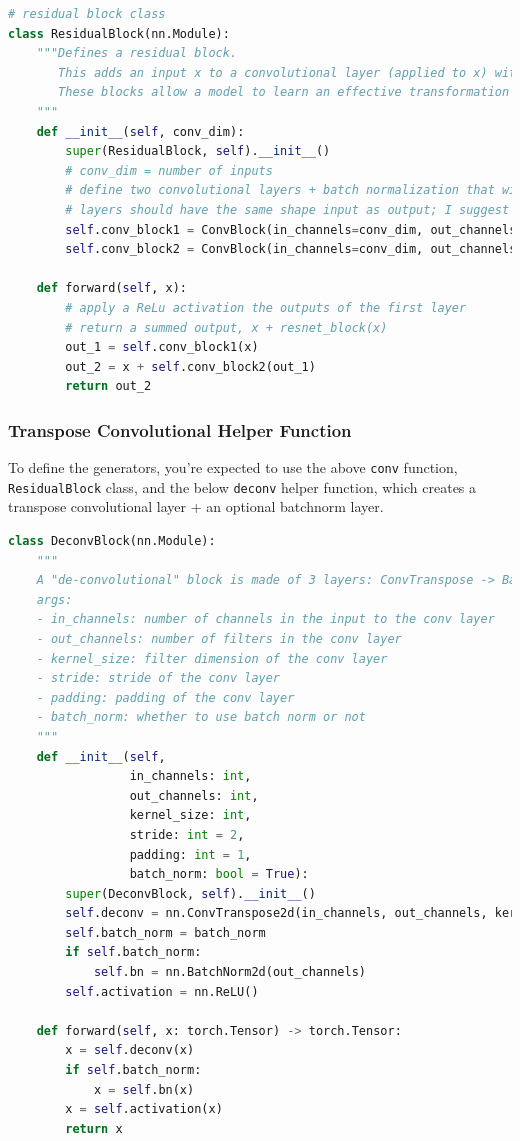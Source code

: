 \begin{lstlisting}[language=Python]
# residual block class
class ResidualBlock(nn.Module):
    """Defines a residual block.
       This adds an input x to a convolutional layer (applied to x) with the same size input and output.
       These blocks allow a model to learn an effective transformation from one domain to another.
    """
    def __init__(self, conv_dim):
        super(ResidualBlock, self).__init__()
        # conv_dim = number of inputs
        # define two convolutional layers + batch normalization that will act as our residual function, F(x)
        # layers should have the same shape input as output; I suggest a kernel_size of 3
        self.conv_block1 = ConvBlock(in_channels=conv_dim, out_channels=conv_dim, kernel_size=3)
        self.conv_block2 = ConvBlock(in_channels=conv_dim, out_channels=conv_dim, kernel_size=3, activation=False)
        
    def forward(self, x):
        # apply a ReLu activation the outputs of the first layer
        # return a summed output, x + resnet_block(x)
        out_1 = self.conv_block1(x)
        out_2 = x + self.conv_block2(out_1)
        return out_2
\end{lstlisting}

\subsubsection{Transpose Convolutional Helper Function}

To define the generators, you're expected to use the above
\lstinline{conv} function,
\lstinline{ResidualBlock} class, and the below
\lstinline{deconv} helper function, which creates a
transpose convolutional layer + an optional batchnorm layer.

\begin{lstlisting}[language=Python]
class DeconvBlock(nn.Module):
    """
    A "de-convolutional" block is made of 3 layers: ConvTranspose -> BatchNorm -> Activation.
    args:
    - in_channels: number of channels in the input to the conv layer
    - out_channels: number of filters in the conv layer
    - kernel_size: filter dimension of the conv layer
    - stride: stride of the conv layer
    - padding: padding of the conv layer
    - batch_norm: whether to use batch norm or not
    """
    def __init__(self, 
                 in_channels: int, 
                 out_channels: int, 
                 kernel_size: int, 
                 stride: int = 2,
                 padding: int = 1,
                 batch_norm: bool = True):
        super(DeconvBlock, self).__init__()
        self.deconv = nn.ConvTranspose2d(in_channels, out_channels, kernel_size, stride, padding, bias=False)
        self.batch_norm = batch_norm
        if self.batch_norm:
            self.bn = nn.BatchNorm2d(out_channels)
        self.activation = nn.ReLU()
        
    def forward(self, x: torch.Tensor) -> torch.Tensor:
        x = self.deconv(x)
        if self.batch_norm:
            x = self.bn(x)
        x = self.activation(x)
        return x
\end{lstlisting}

